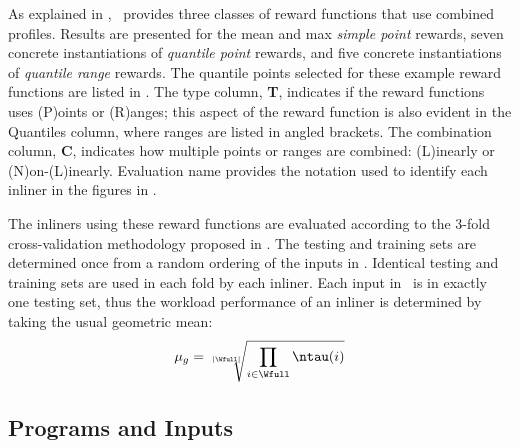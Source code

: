 As explained in \cite{BerubePhD}, \FDI\ provides three classes
of reward functions that use combined profiles.  Results are presented
for the mean and max {\it simple point} rewards, seven concrete
instantiations of {\it quantile point} rewards, and five concrete
instantiations of {\it quantile range} rewards.  The quantile points
selected for these example reward functions are listed
in .  The type column, {\bf T}, indicates if the
reward functions uses (P)oints or (R)anges; this aspect of the reward
function is also evident in the Quantiles column, where ranges are
listed in angled brackets.  The combination column, {\bf C}, indicates
how multiple points or ranges are combined: (L)inearly or
(N)on-(L)inearly.  Evaluation name provides the notation used to
identify each inliner in the figures in \cite{BerubePhD}.


The inliners using these reward functions are evaluated according to
the 3-fold cross-validation methodology proposed in
\cite{BerubePhD}.  The testing and training sets are
determined once from a random ordering of the inputs in \Wfull.
Identical testing and training sets are used in each fold by each
inliner.  Each input in \Wfull\ is in exactly one testing set, thus the
workload performance of an inliner is determined by taking the usual
geometric mean:
$$ \mu_g = \sqrt[|\Wfull|]{ \prod_{i \in \Wfull} \ntau(i) } $$

\subsection{Programs and Inputs}


